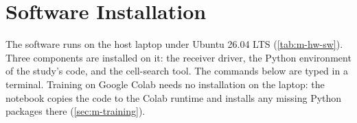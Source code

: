 \chapter{Software Installation}
\label{app:install}


The software runs on the host laptop under Ubuntu 26.04 LTS (\cref{tab:m-hw-sw}). Three components are installed on it: the receiver driver, the Python environment of the study's code, and the cell-search tool. The commands below are typed in a terminal. Training on Google Colab needs no installation on the laptop: the notebook copies the code to the Colab runtime and installs any missing Python packages there (\cref{sec:m-training}).

